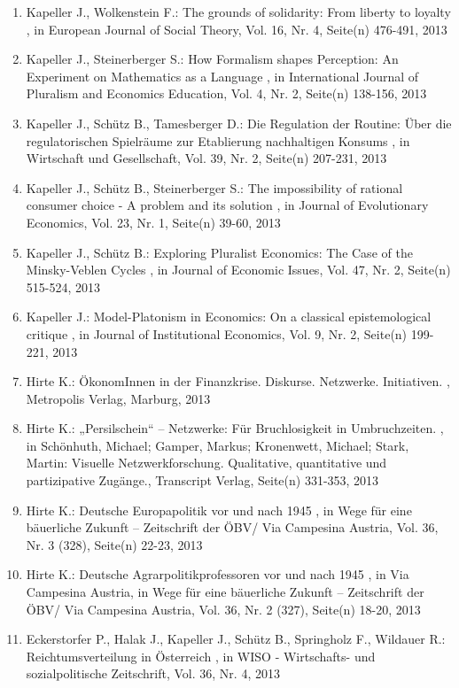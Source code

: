 \begin{enumerate}[leftmargin=*, labelsep=0.5cm]
	 \item Kapeller J., Wolkenstein F.:  The grounds of solidarity: From liberty to loyalty  , in European Journal of Social Theory, Vol. 16, Nr. 4, Seite(n) 476-491, 2013
	 \item Kapeller J., Steinerberger S.:  How Formalism shapes Perception: An Experiment on Mathematics as a Language  , in International Journal of Pluralism and Economics Education, Vol. 4, Nr. 2, Seite(n) 138-156, 2013
	 \item Kapeller J., Schütz B., Tamesberger D.:  Die Regulation der Routine: Über die regulatorischen Spielräume zur Etablierung nachhaltigen Konsums  , in Wirtschaft und Gesellschaft, Vol. 39, Nr. 2, Seite(n) 207-231, 2013
	 \item Kapeller J., Schütz B., Steinerberger S.:  The impossibility of rational consumer choice - A problem and its solution  , in Journal of Evolutionary Economics, Vol. 23, Nr. 1, Seite(n) 39-60, 2013
	 \item Kapeller J., Schütz B.:  Exploring Pluralist Economics: The Case of the Minsky-Veblen Cycles  , in Journal of Economic Issues, Vol. 47, Nr. 2, Seite(n) 515-524, 2013
	 \item Kapeller J.:  Model-Platonism in Economics: On a classical epistemological critique  , in Journal of Institutional Economics, Vol. 9, Nr. 2, Seite(n) 199-221, 2013
	 \item Hirte K.:  ÖkonomInnen in der Finanzkrise. Diskurse. Netzwerke. Initiativen.  , Metropolis Verlag, Marburg, 2013
	 \item Hirte K.:  „Persilschein“ – Netzwerke: Für Bruchlosigkeit in Umbruchzeiten.  , in Schönhuth, Michael; Gamper, Markus; Kronenwett, Michael; Stark, Martin: Visuelle Netzwerkforschung. Qualitative, quantitative und partizipative Zugänge., Transcript Verlag, Seite(n) 331-353, 2013
	 \item Hirte K.:  Deutsche Europapolitik vor und nach 1945  , in Wege für eine bäuerliche Zukunft – Zeitschrift der ÖBV/ Via Campesina Austria, Vol. 36, Nr. 3 (328), Seite(n) 22-23, 2013
	 \item Hirte K.:  Deutsche Agrarpolitikprofessoren vor und nach 1945  , in Via Campesina Austria, in Wege für eine bäuerliche Zukunft – Zeitschrift der ÖBV/ Via Campesina Austria, Vol. 36, Nr. 2 (327), Seite(n) 18-20, 2013
	 \item Eckerstorfer P., Halak J., Kapeller J., Schütz B., Springholz F., Wildauer R.:  Reichtumsverteilung in Österreich  , in WISO - Wirtschafts- und sozialpolitische Zeitschrift, Vol. 36, Nr. 4, 2013

\end{enumerate}
